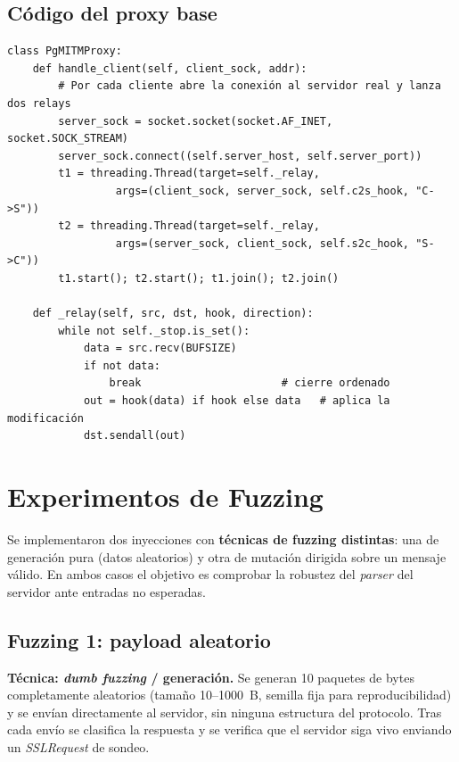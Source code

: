 \documentclass[11pt]{article}
\begin{document}
\subsection{Código del proxy base}
\begin{lstlisting}[style=python, caption={Núcleo del proxy MITM (\texttt{mitm\_proxy.py}).}]
class PgMITMProxy:
    def handle_client(self, client_sock, addr):
        # Por cada cliente abre la conexión al servidor real y lanza dos relays
        server_sock = socket.socket(socket.AF_INET, socket.SOCK_STREAM)
        server_sock.connect((self.server_host, self.server_port))
        t1 = threading.Thread(target=self._relay,
                 args=(client_sock, server_sock, self.c2s_hook, "C->S"))
        t2 = threading.Thread(target=self._relay,
                 args=(server_sock, client_sock, self.s2c_hook, "S->C"))
        t1.start(); t2.start(); t1.join(); t2.join()

    def _relay(self, src, dst, hook, direction):
        while not self._stop.is_set():
            data = src.recv(BUFSIZE)
            if not data:
                break                      # cierre ordenado
            out = hook(data) if hook else data   # aplica la modificación
            dst.sendall(out)
\end{lstlisting}

\section{Experimentos de Fuzzing}

Se implementaron dos inyecciones con \textbf{técnicas de fuzzing distintas}: una
de generación pura (datos aleatorios) y otra de mutación dirigida sobre un
mensaje válido. En ambos casos el objetivo es comprobar la robustez del
\emph{parser} del servidor ante entradas no esperadas.

\subsection{Fuzzing 1: payload aleatorio}
\label{sec:fuzz1}
\textbf{Técnica: \emph{dumb fuzzing} / generación.} Se generan 10 paquetes de
bytes completamente aleatorios (tamaño 10--1000~B, semilla fija para
reproducibilidad) y se envían directamente al servidor, sin ninguna estructura
del protocolo. Tras cada envío se clasifica la respuesta y se verifica que el
servidor siga vivo enviando un \emph{SSLRequest} de sondeo.
\end{document}
